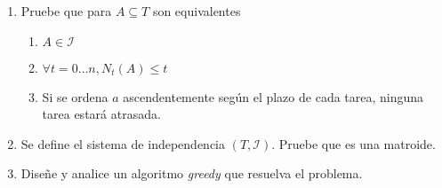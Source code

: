 \begin{enumerate}[label={\bf P\arabic*}]\addtocounter{enumi}{1}
    \item Pruebe que para $A\subseteq T$ son equivalentes \begin{enumerate}
        \item $A\in\mathcal{I}$
        \item $\forall t=0\dots n, N_t(A)\leq t$
        \item Si se ordena $a$ ascendentemente según el plazo de cada tarea, ninguna tarea estará atrasada.
    \end{enumerate}

    \item Se define el sistema de independencia $(T, \mathcal{I})$. Pruebe que es una matroide.
    
    \item Diseñe y analice un algoritmo \textit{greedy} que resuelva el problema.

\end{enumerate}
